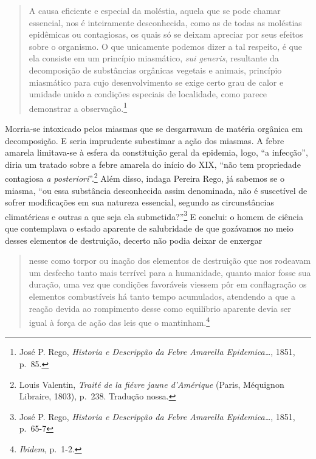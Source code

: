 \begin{quote}
A causa eficiente e especial da moléstia, aquela que se pode chamar
essencial, nos é inteiramente desconhecida, como as de todas as
moléstias epidêmicas ou contagiosas, os quais só se deixam apreciar por
seus efeitos sobre o organismo. O que unicamente podemos dizer a tal
respeito, é que ela consiste em um princípio miasmático, \emph{sui
generis}, resultante da decomposição de substâncias orgânicas vegetais e
animais, princípio miasmático para cujo desenvolvimento se exige certo
grau de calor e umidade unido a condições especiais de localidade, como
parece demonstrar a observação.\footnote{José P. Rego, \emph{Historia e
  Descripção da Febre Amarella Epidemica\ldots{}}, 1851, p.~85.}
\end{quote}

Morria-se intoxicado pelos miasmas que se desgarravam de matéria
orgânica em decomposição. E seria imprudente subestimar a ação dos
miasmas. A febre amarela limitava-se à esfera da constituição geral da
epidemia, logo, ``a infecção'', diria um tratado sobre a febre amarela
do início do XIX, ``não tem propriedade contagiosa \emph{a
posteriori}''.\footnote{Louis Valentin, \emph{Traité de la fiévre jaune
  d'Amérique} (Paris, Méquignon Libraire, 1803), p.~238. Tradução nossa.}
Além disso, indaga Pereira Rego, já sabemos se o miasma, ``ou essa
substância desconhecida assim denominada, não é suscetível de sofrer
modificações em sua natureza essencial, segundo as circunstâncias
climatéricas e outras a que seja ela submetida?''\footnote{José P. Rego,
  \emph{Historia e Descripção da Febre Amarella Epidemica\ldots{}},
  1851, p.~65-7} E conclui: o homem de ciência que contemplava o estado
aparente de salubridade de que gozávamos no meio desses elementos de
destruição, decerto não podia deixar de enxergar

\begin{quote}
nesse como torpor ou inação dos elementos de destruição que nos rodeavam
um desfecho tanto mais terrível para a humanidade, quanto maior fosse
sua duração, uma vez que condições favoráveis viessem pôr em
conflagração os elementos combustíveis há tanto tempo acumulados,
atendendo a que a reação devida ao rompimento desse como equilíbrio
aparente devia ser igual à força de ação das leis que o
mantinham.\footnote{\emph{Ibidem}, p.~1-2.}
\end{quote}

